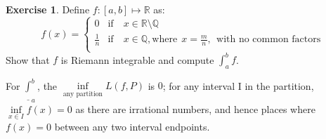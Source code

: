 \documentclass[11pt,oneside]{article}
\numberwithin{equation}{section}
\theoremstyle{definition}
\newtheorem{exercise}{Exercise}
\def\RR{\mathbb{R}}
\def\QQ{\mathbb{Q}}
\begin{document}
\begin{exercise}
  Define $f : [a,b ] \mapsto \RR $ as:
  $$
  f(x) = \begin{cases}
    0 & \text{if} \quad x \in \RR \setminus \QQ \\
    \frac{1}{n} & \text{if} \quad x \in \QQ, \text{where}\ \  x = \frac{m}{n}, \ \ 
    \text{with no common factors} \\
  \end{cases}
  $$
  Show that $f$ is Riemann integrable and compute $\int _ {a} ^ {b} f$.  
\end{exercise}
\begin{solution}

  

  For $\underline \int _a ^b$, the $\inf \limits_{\text{any
      partition}} L(f, P)$ is $0$; for any interval I in the
  partition, $\inf \limits _ {x \in I} f(x) = 0$ as there are
  irrational numbers, and hence places where $f(x) = 0$ between any
  two interval endpoints.

  
\end{solution}
\end{document}
